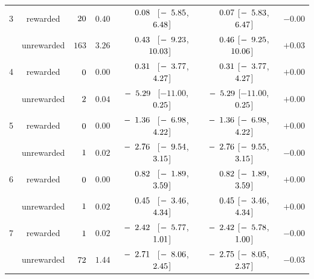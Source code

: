 \begin{table}[htbp]
{\begin{tabular}{lcccccc}
3 & rewarded & $\hphantom{0}20$ & $0.40$ & $\hphantom{-}\hphantom{0}0.08^{\hphantom{*}}$ [$-\hphantom{0}5.85$, $\hphantom{-}\hphantom{0}6.48$] & $\hphantom{-}\hphantom{0}0.07$ [$-\hphantom{0}5.83$, $\hphantom{-}\hphantom{0}6.47$] & $-0.00$ \\
 & unrewarded & $163$ & $3.26$ & $\hphantom{-}\hphantom{0}0.43^{\hphantom{*}}$ [$-\hphantom{0}9.23$, $\hphantom{-}10.03$] & $\hphantom{-}\hphantom{0}0.46$ [$-\hphantom{0}9.25$, $\hphantom{-}10.06$] & $+0.03$ \\
4 & rewarded & $\hphantom{00}0$ & $0.00$ & $\hphantom{-}\hphantom{0}0.31^{\hphantom{*}}$ [$-\hphantom{0}3.77$, $\hphantom{-}\hphantom{0}4.27$] & $\hphantom{-}\hphantom{0}0.31$ [$-\hphantom{0}3.77$, $\hphantom{-}\hphantom{0}4.27$] & $+0.00$ \\
 & unrewarded & $\hphantom{00}2$ & $0.04$ & $-\hphantom{0}5.29^{\hphantom{*}}$ [$-11.00$, $\hphantom{-}\hphantom{0}0.25$] & $-\hphantom{0}5.29$ [$-11.00$, $\hphantom{-}\hphantom{0}0.25$] & $+0.00$ \\
5 & rewarded & $\hphantom{00}0$ & $0.00$ & $-\hphantom{0}1.36^{\hphantom{*}}$ [$-\hphantom{0}6.98$, $\hphantom{-}\hphantom{0}4.22$] & $-\hphantom{0}1.36$ [$-\hphantom{0}6.98$, $\hphantom{-}\hphantom{0}4.22$] & $+0.00$ \\
 & unrewarded & $\hphantom{00}1$ & $0.02$ & $-\hphantom{0}2.76^{\hphantom{*}}$ [$-\hphantom{0}9.54$, $\hphantom{-}\hphantom{0}3.15$] & $-\hphantom{0}2.76$ [$-\hphantom{0}9.55$, $\hphantom{-}\hphantom{0}3.15$] & $-0.00$ \\
6 & rewarded & $\hphantom{00}0$ & $0.00$ & $\hphantom{-}\hphantom{0}0.82^{\hphantom{*}}$ [$-\hphantom{0}1.89$, $\hphantom{-}\hphantom{0}3.59$] & $\hphantom{-}\hphantom{0}0.82$ [$-\hphantom{0}1.89$, $\hphantom{-}\hphantom{0}3.59$] & $+0.00$ \\
 & unrewarded & $\hphantom{00}1$ & $0.02$ & $\hphantom{-}\hphantom{0}0.45^{\hphantom{*}}$ [$-\hphantom{0}3.46$, $\hphantom{-}\hphantom{0}4.34$] & $\hphantom{-}\hphantom{0}0.45$ [$-\hphantom{0}3.46$, $\hphantom{-}\hphantom{0}4.34$] & $+0.00$ \\
7 & rewarded & $\hphantom{00}1$ & $0.02$ & $-\hphantom{0}2.42^{\hphantom{*}}$ [$-\hphantom{0}5.77$, $\hphantom{-}\hphantom{0}1.01$] & $-\hphantom{0}2.42$ [$-\hphantom{0}5.78$, $\hphantom{-}\hphantom{0}1.00$] & $-0.00$ \\
 & unrewarded & $\hphantom{0}72$ & $1.44$ & $-\hphantom{0}2.71^{\hphantom{*}}$ [$-\hphantom{0}8.06$, $\hphantom{-}\hphantom{0}2.45$] & $-\hphantom{0}2.75$ [$-\hphantom{0}8.05$, $\hphantom{-}\hphantom{0}2.37$] & $-0.03$ \\

\end{tabular}}
\end{table}
